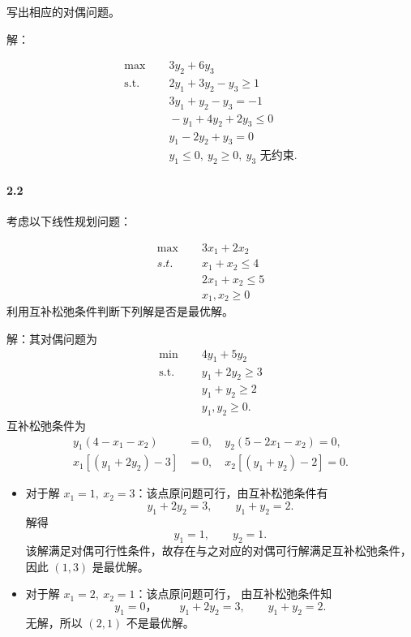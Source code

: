 \documentclass[12pt,a4paper]{article}
\begin{document}
写出相应的对偶问题。

解：

\begin{align*}
\max\;&\quad 3y_2+6y_3\\
\text{s.t. }&\quad 2y_1+3y_2-y_3\ge 1\\
&\quad 3y_1+y_2-y_3=-1\\
&\quad -y_1+4y_2+2y_3\le 0\\
&\quad y_1-2y_2+y_3=0\\
&\quad y_1\le 0,\ y_2\ge 0,\ y_3\text{ 无约束}.
\end{align*}

\paragraph{2.2}
考虑以下线性规划问题：

\begin{align*}
   \max \quad &\; 3x_1 + 2x_2\\
   s.t.\quad &\;x_1 + x_2 \leq 4 \\
&\;2x_1 + x_2 \leq 5 \\
&\;x_1, x_2 \geq 0
\end{align*}
利用互补松弛条件判断下列解是否是最优解。

解：其对偶问题为
\begin{align*}
\min\;&\quad 4y_1+5y_2\\
\text{s.t. }&\quad y_1+2y_2\ge 3\\
&\quad y_1+y_2\ge 2\\
&\quad y_1,y_2\ge 0.
\end{align*}
互补松弛条件为
\begin{align*}
y_1(4-x_1-x_2)&=0,\quad y_2(5-2x_1-x_2)=0,\\
x_1[(y_1+2y_2)-3]&=0,\quad x_2[(y_1+y_2)-2]=0.
\end{align*}

\begin{itemize}
    \item 对于解 \(x_1=1,\ x_2=3\)：该点原问题可行，由互补松弛条件有
    \[
    y_1+2y_2=3,\qquad y_1+y_2=2.
    \]
    解得
    \[
    y_1=1,\qquad y_2=1.
    \]
    该解满足对偶可行性条件，故存在与之对应的对偶可行解满足互补松弛条件，因此 \((1,3)\) 是最优解。

    \item 对于解 \(x_1=2,\ x_2=1\)：该点原问题可行，
由互补松弛条件知 
    \[
	y_1=0，\qquad
    y_1+2y_2=3,\qquad y_1+y_2=2.
    \]
无解，所以 \((2,1)\) 不是最优解。
\end{itemize}
\end{document}
